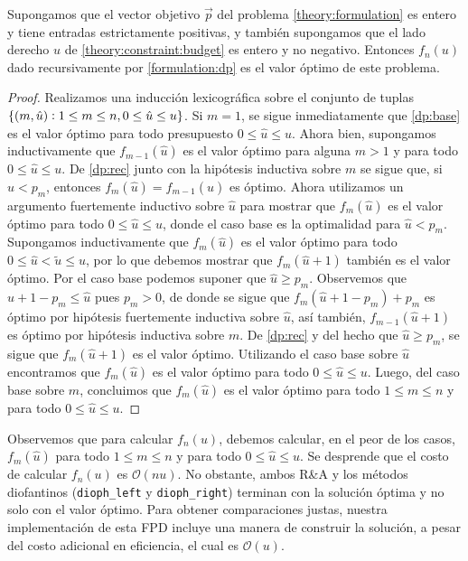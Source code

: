 \begin{theorem}
	Supongamos que el vector objetivo $\vec{p}$ del problema \eqref{theory:formulation} es entero y
	tiene entradas estrictamente positivas, y también supongamos que el lado derecho $u$ de
	\eqref{theory:constraint:budget} es entero y no negativo. Entonces $f_n(u)$ dado recursivamente
	por \eqref{formulation:dp} es el valor óptimo de este problema.
\end{theorem}
\begin{proof}
	Realizamos una inducción lexicográfica sobre el conjunto de tuplas $\lbrace (m, \hat{u})
	\vcentcolon 1 \leq m \leq n, 0 \leq \hat{u} \leq u \rbrace$. Si $m = 1$, se sigue inmediatamente que
	\eqref{dp:base} es el valor óptimo para todo presupuesto $0 \leq \hat{u} \leq u$. Ahora bien,
	supongamos inductivamente que $f_{m-1}(\hat{u})$ es el valor óptimo para alguna $m > 1$ y para
	todo $0 \leq \hat{u} \leq u$. De \eqref{dp:rec} junto con la hipótesis inductiva sobre $m$ se
	sigue que, si $\hat{u} < p_m$, entonces $f_m(\hat{u}) = f_{m-1}(\hat{u})$ es óptimo. Ahora
	utilizamos un argumento fuertemente inductivo sobre $\hat{u}$ para mostrar que $f_m(\hat{u})$ es
	el valor óptimo para todo $0 \leq \hat{u} \leq u$, donde el caso base es la optimalidad para
	$\hat{u} < p_m$. Supongamos inductivamente que $f_m(\hat{u})$ es el valor óptimo para todo $0 \leq \hat{u}
	< \tilde{u} \leq u$, por lo que debemos mostrar que $f_m(\hat{u} + 1)$ también es el valor
	óptimo. Por el caso base podemos suponer que $\hat{u} \geq p_m$. Observemos que $\hat{u} + 1 -
	p_m \leq \hat{u}$ pues $p_m > 0$, de donde se sigue que $f_m(\hat{u} + 1 - p_m) + p_m$ es óptimo
	por hipótesis fuertemente inductiva sobre $\hat{u}$, así también, $f_{m-1}(\hat{u} + 1)$ es
	óptimo por hipótesis inductiva sobre $m$. De \eqref{dp:rec} y del hecho que $\hat{u} \geq p_m$,
	se sigue que $f_m(\hat{u} + 1)$ es el valor óptimo. Utilizando el caso base sobre $\hat{u}$
	encontramos que $f_m(\hat{u})$ es el valor óptimo para todo $0 \leq \hat{u} \leq u$. Luego, del caso
	base sobre $m$, concluimos que $f_m(\hat{u})$ es el valor óptimo para todo $1 \leq m \leq n$ y
	para todo $0 \leq \hat{u} \leq u$.
\end{proof}

Observemos que para calcular $f_n(u)$, debemos calcular, en el peor de los casos, $f_m(\hat{u})$ para
todo $1 \leq m \leq n$ y para todo $0 \leq \hat{u} \leq u$. Se desprende que el costo de calcular
$f_n(u)$ es $\mathcal{O}(nu)$. No obstante, ambos R\&A y los métodos diofantinos
(\texttt{dioph\_left} y \texttt{dioph\_right}) terminan con la solución óptima y no solo con el valor
óptimo. Para obtener comparaciones justas, nuestra implementación de esta FPD incluye una manera de
construir la solución, a pesar del costo adicional en eficiencia, el cual es $\mathcal{O}(u)$.

